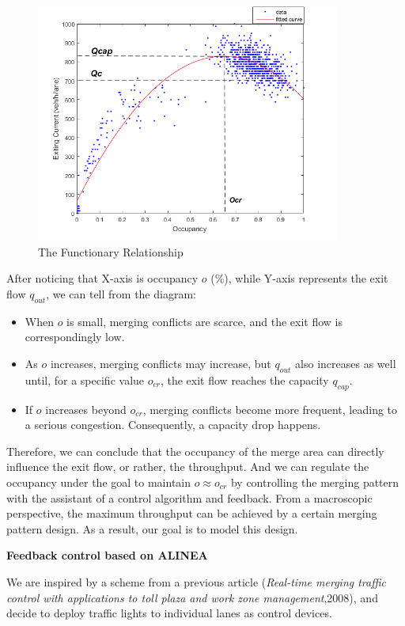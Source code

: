 \documentclass{mcmthesis}
\begin{document}
\begin{figure}[h]
\small
\centering
\includegraphics[width=10cm]{figure3}
\caption{The Functionary Relationship}\label{fig3}
\end{figure}

After noticing that X-axis is occupancy $o$ (\%), while
Y-axis represents the exit flow $q_{out}$, we can tell from
the diagram:
\begin{itemize}
\item When $o$ is small, merging conflicts are scarce, and
the exit flow is correspondingly low.
\item As $o$ increases, merging conflicts may increase, but
$q_{out}$ also increases as well until, for a specific value
$o_{cr}$, the exit flow reaches the capacity $q_{cap}$.
\item If $o$ increases beyond $o_{cr}$, merging conflicts
become more frequent, leading to a serious congestion.
Consequently, a capacity drop happens.
\end{itemize}
Therefore, we can conclude that the occupancy of the merge
area can directly influence the exit flow, or rather, the
throughput. And we can regulate the occupancy under the
goal to maintain $o  \approx  o_{cr}$ by controlling the merging
pattern with the assistant of a control algorithm and
feedback. From a macroscopic perspective, the maximum
throughput can be achieved by a certain merging pattern
design. As a result, our goal is to model this design.

\textbf{Feedback control based on ALINEA}

We are inspired by a scheme from a previous article
(\emph{Real-time merging traffic control with applications
to toll plaza and work zone management},2008), and
decide to deploy traffic lights to individual lanes
as control devices.
\end{document}
